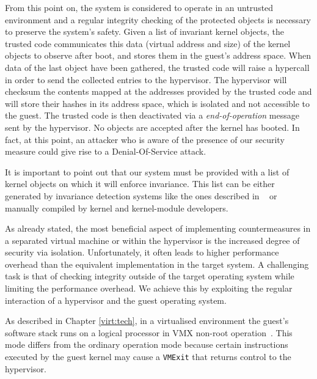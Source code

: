 From this point on, the system is considered to operate in an untrusted environment and a regular integrity checking of the protected objects is necessary to preserve the system's safety.
Given a list of invariant kernel objects, the trusted code communicates this data (virtual address and size) of the kernel objects to observe after boot, and stores them in the guest's address space. When data of the last object have been gathered, the trusted code will raise a hypercall in order to send the collected entries to the hypervisor. The hypervisor will checksum the contents mapped at the addresses provided by the trusted code and will store their hashes in its address space, which is isolated and not accessible to the guest. The trusted code is then deactivated via a \emph{end-of-operation} message sent by the hypervisor. No objects are accepted after the kernel has booted. In fact, at this point, an attacker who is aware of the presence of our security measure could give rise to a Denial-Of-Service attack.

It is important to point out that our system must be provided with a list of kernel objects on which it will enforce invariance. This list can be either generated by invariance detection systems like the ones described in ~\cite{HookSafe,6,7,8} or manually compiled by kernel and kernel-module developers.

As already stated, the most beneficial aspect of implementing countermeasures in a separated virtual machine or within the hypervisor is the increased degree of security via isolation. Unfortunately, it often leads to higher performance overhead than the equivalent implementation in the target system. 
A challenging task is that of checking integrity outside of the target operating system while limiting the performance overhead. We achieve this by exploiting the regular interaction of a hypervisor and the guest operating system. 

As described in Chapter \ref{virt:tech}, in a virtualised environment the guest's software stack runs on a logical processor in VMX non-root operation~\cite{Intel2007}. This mode differs from the ordinary operation mode because certain instructions executed by the guest kernel may cause a \texttt{VMExit} that returns control to the hypervisor.


